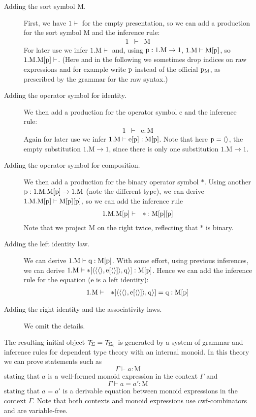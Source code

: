 \documentclass{mscs}
\newcommand{\FYI}[1]{{#1}}
\def\Mon{\mathrm{M}}
\def\idmon{\mathrm{e}}
\def\comp{\mathrm{*}}
\begin{document}
\begin{description}
\item[Adding the sort symbol $\Mon$.]
First, we have $1 \vdash$ for the empty \FYI{presentation}, so we can
add a production for the sort symbol $\Mon$ and the inference rule:
\begin{eqnarray*}
1 &\vdash& \Mon
\end{eqnarray*}
For later use we infer $1.\Mon \vdash$ and, using $\p :1.\Mon \to 1$, $1.\Mon\vdash\Mon[\p]$,
so $1.\Mon.\Mon[\p] \vdash$.  (Here and in the following we sometimes drop indices on raw expressions and for example write $\mathrm{p}$ instead of the official $\p_\Mon$, as prescribed by the grammar for the raw syntax.)
\item[Adding the operator symbol for identity.]
We then add a production for the operator symbol $\idmon$ and the inference rule:
\begin{eqnarray*}
1 &\vdash& \idmon : \Mon
\end{eqnarray*}
Again for later use we infer $1.\Mon\vdash \idmon[\p] :\Mon[\p]$.
Note that here $\mathrm{p} = \langle  \rangle$, the empty substitution $1.\Mon \to 1$,
since there is only one substitution $1.\Mon \to 1$.
\item[Adding the operator symbol for composition.]
We then add a production for the binary operator symbol $\comp$.
Using another $\p: 1.\Mon.\Mon[\p] \to 1.\Mon$ (note the different type),
we can derive $1.\Mon.\Mon[\p] \vdash \Mon[\p][\p]$, so we can add the inference rule
\begin{eqnarray*}
1.\Mon.\Mon[\p] &\vdash& \comp : \Mon[\p][\p]
\end{eqnarray*}
Note that we project $\Mon$ on the right twice, reflecting that $\comp$ is binary.
\item[Adding the left identity law.]
We can derive $1.\Mon \vdash \q : \Mon[\p]$. With some effort,
using previous inferences, we can  derive
$1.\Mon \vdash \comp[\tuple{\tuple{\tuple{},\idmon[\tuple{}]},\q}] : \Mon[\p]$.
Hence we can add the inference rule for the equation ($\idmon$ is a left identity):
\begin{eqnarray*}
1.\Mon &\vdash& \comp[\tuple{\tuple{\tuple{},\idmon[\tuple{}]},\q}] = \q : \Mon[\p]
\end{eqnarray*}
\item[Adding the right identity and the associativity laws.]
We omit the details.
\end{description}
The resulting initial object ${\mathcal T}_\Sigma = {\mathcal T}_{\Sigma_6}$ is generated by a system of grammar and inference rules for dependent type theory with an internal monoid. In this theory we can prove statements such as
$$
\Gamma \vdash a : \Mon
$$
stating that $a$ is a well-formed monoid expression in the context $\Gamma$ and
$$
\Gamma \vdash a = a': \Mon
$$
stating that $a = a'$ is a derivable equation between monoid expressions in the context $\Gamma$. Note that both contexts and monoid expressions use cwf-combinators and are variable-free.
\end{document}

